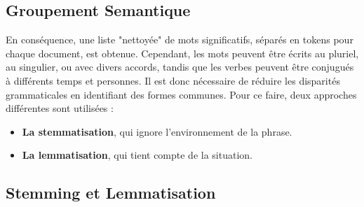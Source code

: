 

\subsection{Groupement Semantique}
En conséquence, une liste "nettoyée" de mots significatifs, séparés en tokens pour chaque document, est obtenue. Cependant, les mots peuvent être écrits au pluriel, au singulier, ou avec divers accords, tandis que les verbes peuvent être conjugués à différents temps et personnes.
Il est donc nécessaire de réduire les disparités grammaticales en identifiant des formes communes. Pour ce faire, deux approches différentes sont utilisées :
\begin{itemize}
    \item \textbf{La stemmatisation}, qui ignore l'environnement de la phrase. \hfill \\
    \item \textbf{La lemmatisation}, qui tient compte de la situation.
\end{itemize}



\subsection{ Stemming et Lemmatisation }

